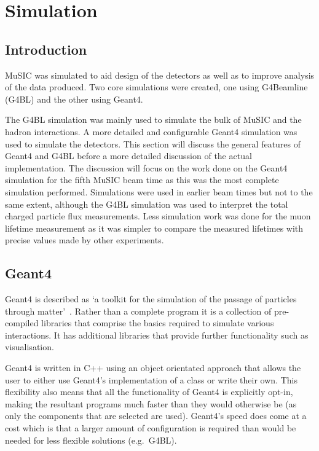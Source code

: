 \chapter{Simulation} %
\label{prt:simulation}
\section{Introduction} %
\label{cha:sim_introduction}
MuSIC was simulated to aid design of the detectors as well as to improve analysis of the data produced. Two core simulations were created, one using G4Beamline (G4BL) and the other using Geant4. 

The G4BL simulation was mainly used to simulate the bulk of MuSIC and the hadron interactions. A more detailed and configurable Geant4 simulation was used to simulate the detectors. This section will discuss the general features of Geant4 and G4BL before a more detailed discussion of the actual implementation. The discussion will focus on the work done on the Geant4 simulation for the fifth MuSIC beam time as this was the most complete simulation performed. Simulations were used in earlier beam times but not to the same extent, although the G4BL simulation was used to interpret the total charged particle flux measurements. Less simulation work was done for the muon lifetime measurement as it was simpler to compare the measured lifetimes with precise values made by other experiments.

\section{Geant4} %
\label{sec:geant4}
Geant4 is described as `a toolkit for the simulation of the passage of particles through matter'~\cite{geant4}. Rather than a complete program it is a collection of pre-compiled libraries that comprise the basics required to simulate various interactions. It has additional libraries that provide further functionality such as visualisation. 

Geant4 is written in C++ using an object orientated approach that allows the user to either use Geant4's implementation of a class or write their own. This flexibility also means that all the functionality of Geant4 is explicitly opt-in, making the resultant programs much faster than they would otherwise be (as only the components that are selected are used). Geant4's speed does come at a cost which is that a larger amount of configuration is required than would be needed for less flexible solutions (e.g.\ G4BL).

